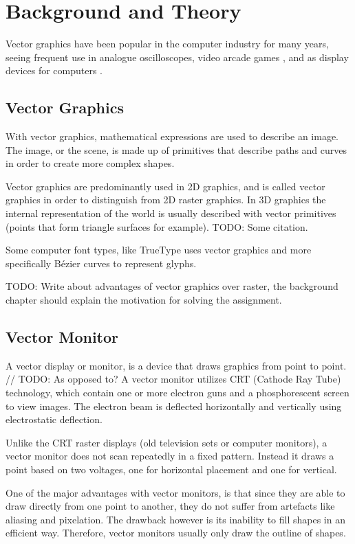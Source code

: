 \chapter{Background and Theory}

Vector graphics have been popular in the computer industry for many years, seeing frequent use in analogue oscilloscopes, video arcade games \cite{astroids}, and as display devices for computers \cite{ibm2250}.

\section{Vector Graphics}

With vector graphics, mathematical expressions are used to describe an image.
The image, or the scene, is made up of primitives that describe paths and curves in order to create more complex shapes.

Vector graphics are predominantly used in 2D graphics, and is called vector graphics in order to distinguish from 2D raster graphics.
In 3D graphics the internal representation of the world is usually described with vector primitives (points that form triangle surfaces for example). TODO: Some citation.

Some computer font types, like TrueType uses vector graphics and more specifically Bézier curves to represent glyphs\cite{truetype}.


TODO: Write about advantages of vector graphics over raster, the background chapter should explain the motivation for solving the assignment.


\section{Vector Monitor}
A vector display or monitor, is a device that draws graphics from point to point. // TODO: As opposed to?
A vector monitor utilizes CRT (Cathode Ray Tube) technology, which contain one or more electron guns and a phosphorescent screen to view images.
The electron beam is deflected horizontally and vertically using electrostatic deflection. \cite{vector-monitor}

Unlike the CRT raster displays (old television sets or computer monitors), a vector monitor does not scan repeatedly in a fixed pattern.
Instead it draws a point based on two voltages, one for horizontal placement and one for vertical.

One of the major advantages with vector monitors, is that since they are able to draw directly from one point to another, they do not suffer from artefacts like aliasing and pixelation.
The drawback however is its inability to fill shapes in an efficient way.
Therefore, vector monitors usually only draw the outline of shapes.



